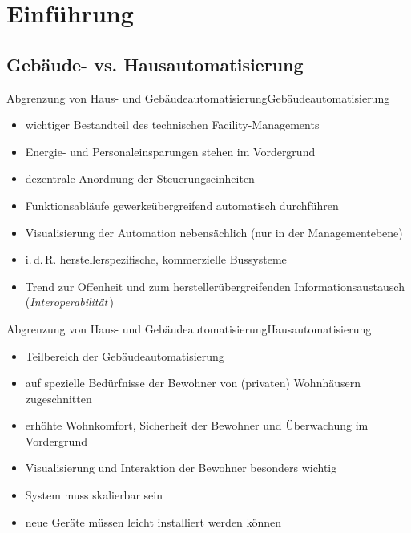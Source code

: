 \section{Einführung}
\myContentSectionFrame


\subsection{Gebäude- vs. Hausautomatisierung}


\begin{frame}{Abgrenzung von Haus- und Gebäudeautomatisierung}{Gebäudeautomatisierung}
	\begin{itemize}
	\item 	wichtiger Bestandteil des technischen Facility-Managements
	\item 	Energie- und Personaleinsparungen stehen im Vordergrund
	\item 	dezentrale Anordnung der Steuerungseinheiten
	\item 	Funktionsabläufe gewerkeübergreifend automatisch durchführen
	\item 	Visualisierung der Automation nebensächlich\newline
			(nur in der Managementebene)
	\item 	i.\,d.\,R. herstellerspezifische, kommerzielle Bussysteme
	\item 	Trend zur Offenheit und zum herstellerübergreifenden Informationsaustausch
			(\emph{Interoperabilität}\,)
	\end{itemize}
\end{frame}


\begin{frame}{Abgrenzung von Haus- und Gebäudeautomatisierung}{Hausautomatisierung}
	\begin{itemize}
	\item 	Teilbereich der Gebäudeautomatisierung
	\item 	auf spezielle Bedürfnisse der Bewohner von (privaten) Wohnhäusern zugeschnitten
	\item 	erhöhte Wohnkomfort, Sicherheit der Bewohner und Überwachung im Vordergrund
	\item 	Visualisierung und Interaktion der Bewohner besonders wichtig
	\item 	System muss skalierbar sein
	\item 	neue Geräte müssen leicht installiert werden können
	\end{itemize}
\end{frame}

